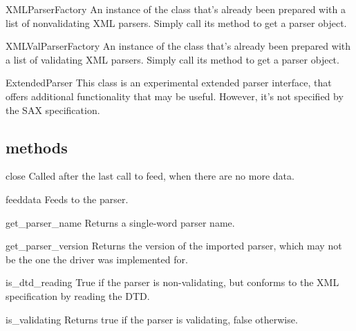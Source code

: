\documentclass{howto}
\begin{document}
\begin{datadesc}{XMLParserFactory}
An instance of the  class that's already been
prepared with a list of nonvalidating XML parsers.  Simply call its
 method to get a parser object. 
\end{datadesc}

\begin{datadesc}{XMLValParserFactory}
An instance of the  class that's already been
prepared with a list of validating XML parsers.  Simply call its
 method to get a parser object. 
\end{datadesc}

\begin{classdesc}{ExtendedParser}{}
This class is an experimental extended parser interface, that offers
additional functionality that may be useful.  However, it's not
specified by the SAX specification.
\end{classdesc}

\subsection{ methods}

\begin{methoddesc}{close}{}
Called after the last call to feed, when there are no more data.
\end{methoddesc}

\begin{methoddesc}{feed}{data}
Feeds  to the parser.
\end{methoddesc}

\begin{methoddesc}{get_parser_name}{}
Returns a single-word parser name.
\end{methoddesc}

\begin{methoddesc}{get_parser_version}{}
Returns the version of the imported parser, which may not be the
one the driver was implemented for.
\end{methoddesc}

\begin{methoddesc}{is_dtd_reading}{}
True if the parser is non-validating, but conforms to the XML
specification by reading the DTD.
\end{methoddesc}

\begin{methoddesc}{is_validating}{}
Returns true if the parser is validating, false otherwise.
\end{methoddesc}
\end{document}

